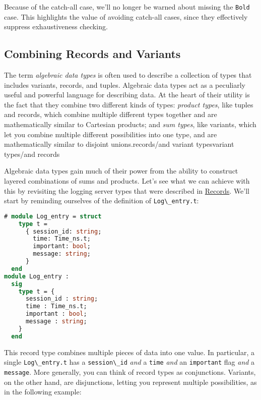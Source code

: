 Because of the catch-all case, we'll no longer be warned about missing
the \passthrough{\lstinline!Bold!} case. This highlights the value of
avoiding catch-all cases, since they effectively suppress exhaustiveness
checking.

\hypertarget{combining-records-and-variants}{%
\subsection{Combining Records and
Variants}\label{combining-records-and-variants}}

The term \emph{algebraic data types} is often used to describe a
collection of types that includes variants, records, and tuples.
Algebraic data types act as a peculiarly useful and powerful language
for describing data. At the heart of their utility is the fact that they
combine two different kinds of types: \emph{product types}, like tuples
and records, which combine multiple different types together and are
mathematically similar to Cartesian products; and \emph{sum types}, like
variants, which let you combine multiple different possibilities into
one type, and are mathematically similar to disjoint
unions.\protect\hypertarget{RECvartyp}{}{records/and variant
types}\protect\hypertarget{VARTYPrec}{}{variant types/and records}

Algebraic data types gain much of their power from the ability to
construct layered combinations of sums and products. Let's see what we
can achieve with this by revisiting the logging server types that were
described in \href{records.html\#records}{Records}. We'll start by
reminding ourselves of the definition of
\passthrough{\lstinline!Log\_entry.t!}:

\begin{lstlisting}[language=Caml]
# module Log_entry = struct
    type t =
      { session_id: string;
        time: Time_ns.t;
        important: bool;
        message: string;
      }
  end
module Log_entry :
  sig
    type t = {
      session_id : string;
      time : Time_ns.t;
      important : bool;
      message : string;
    }
  end
\end{lstlisting}

This record type combines multiple pieces of data into one value. In
particular, a single \passthrough{\lstinline!Log\_entry.t!} has a
\passthrough{\lstinline!session\_id!} \emph{and} a
\passthrough{\lstinline!time!} \emph{and} an
\passthrough{\lstinline!important!} flag \emph{and} a
\passthrough{\lstinline!message!}. More generally, you can think of
record types as conjunctions. Variants, on the other hand, are
disjunctions, letting you represent multiple possibilities, as in the
following example:

